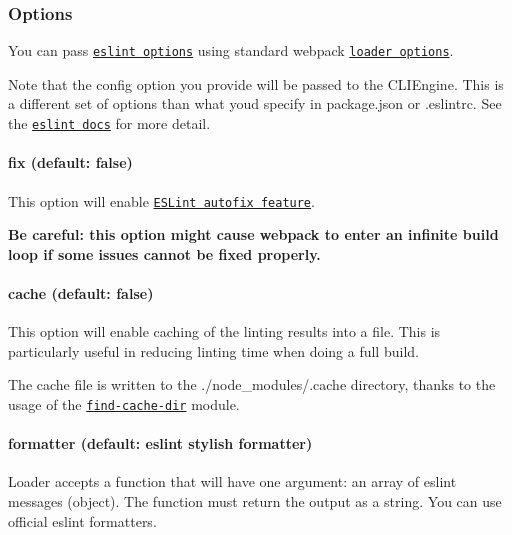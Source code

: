\subsubsection*{Options}

You can pass \href{http://eslint.org/docs/developer-guide/nodejs-api#cliengine}{\tt eslint options} using standard webpack \href{https://webpack.js.org/configuration/module/#useentry}{\tt loader options}.

Note that the config option you provide will be passed to the {\ttfamily C\+L\+I\+Engine}. This is a different set of options than what you\textquotesingle{}d specify in {\ttfamily package.\+json} or {\ttfamily .eslintrc}. See the \href{http://eslint.org/docs/developer-guide/nodejs-api#cliengine}{\tt eslint docs} for more detail.

\paragraph*{{\ttfamily fix} (default\+: false)}

This option will enable \href{http://eslint.org/docs/user-guide/command-line-interface#fix}{\tt E\+S\+Lint autofix feature}.

{\bfseries Be careful\+: this option might cause webpack to enter an infinite build loop if some issues cannot be fixed properly.}

\paragraph*{{\ttfamily cache} (default\+: false)}

This option will enable caching of the linting results into a file. This is particularly useful in reducing linting time when doing a full build.

The cache file is written to the {\ttfamily ./node\+\_\+modules/.cache} directory, thanks to the usage of the \href{https://www.npmjs.com/package/find-cache-dir}{\tt find-\/cache-\/dir} module.

\paragraph*{{\ttfamily formatter} (default\+: eslint stylish formatter)}

Loader accepts a function that will have one argument\+: an array of eslint messages (object). The function must return the output as a string. You can use official eslint formatters.


